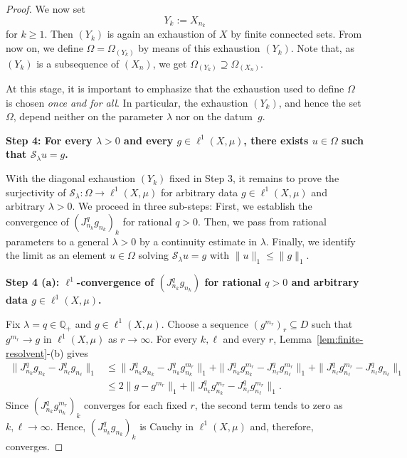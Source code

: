 \documentclass[letterpaper]{article}
\theoremstyle{definition}
\theoremstyle{named}
\numberwithin{equation}{section}
\begin{document}
\begin{proof}
We now set
\[
Y_k:=X_{n_k}
\]
for $k\geq 1$.
Then $(Y_k)$ is again an exhaustion of $X$ by finite connected sets. From now on, we define $\Omega = \Omega_{(Y_k)}$ by means of this exhaustion $(Y_k)$. Note that, as $(Y_k)$ is a subsequence of $(X_n)$, we get $\Omega_{(Y_k)} \supseteq \Omega_{(X_n)}$.



At this stage, it is important to emphasize that the exhaustion used to define \(\Omega\) is chosen \emph{once and for all}.  In particular, the exhaustion \((Y_k)\), and hence the set \(\Omega\), depend neither on the parameter \(\lambda\) nor on the datum~\(g\).




\medskip
\noindent\textbf{Step 4: For every $\lambda>0$ and every  $g\in \ell^1(X,\mu)$, there exists $u\in \Omega$ such that $\mathcal{S}_\lambda u=g $.}

With the diagonal exhaustion $(Y_k)$ fixed in Step 3, it remains 
to prove the  surjectivity of $\mathcal{S}_\lambda \colon \Omega \to \ell^1(X,\mu)$ 
for arbitrary data \(g\in \ell^1(X,\mu)\) and arbitrary \(\lambda>0\). 
We proceed in three sub-steps: First, we establish the convergence of \((J_{n_k}^{q}g_{n_k})_k\) for rational \(q>0\). Then, we pass from rational parameters to a general \(\lambda>0\) by a continuity estimate in \(\lambda\). Finally, we identify the limit as an element \(u\in \Omega\) solving \(\mathcal{S}_\lambda u=g\) with \(\|u\|_1\le \|g\|_1\).





\medskip
\noindent
\textbf{Step 4 (a): $\ell^1$-convergence of $(J_{n_k}^q g_{n_k})$ for rational $q>0$ and arbitrary data $g \in \ell^1(X,\mu)$.}

Fix $\lambda = q\in \mathbb Q_+$ and $g\in \ell^1(X,\mu)$. Choose a sequence $(g^{m_r})_r\subseteq D$ such that $g^{m_r}\to g$ in $\ell^1(X,\mu)$ as $r \to \infty$. For every $k,\ell$ and every $r$, Lemma~\ref{lem:finite-resolvent}-(b) gives
\begin{align*}
\|J_{n_k}^q g_{n_k}-J_{n_\ell}^q g_{n_\ell}\|_1
&\leq \|J_{n_k}^q g_{n_k} - J_{n_k}^q g_{n_k}^{m_r}\|_1
+\|J_{n_k}^q g_{n_k}^{m_r}-J_{n_\ell}^q g_{n_\ell}^{m_r}\|_1
+\|J_{n_\ell}^q g_{n_\ell}^{m_r}-J_{n_\ell}^q g_{n_\ell}\|_1 \\
&\leq 2\|g-g^{m_r}\|_1+\|J_{n_k}^q g_{n_k}^{m_r}-J_{n_\ell}^q g_{n_\ell}^{m_r}\|_1.
\end{align*}
Since $(J_{n_k}^q g_{n_k}^{m_r})_k$ converges for each fixed $r$, the second term tends to zero as $k,\ell\to\infty$. Hence, $(J_{n_k}^q g_{n_k})_k$ is Cauchy in $\ell^1(X,\mu)$ and, therefore, converges.


\end{proof}
\end{document}
